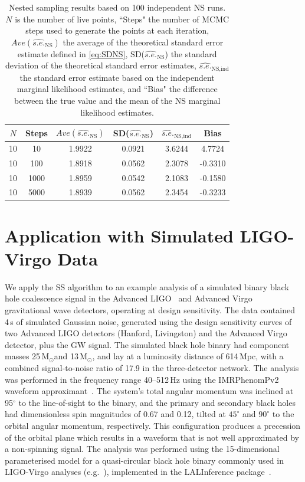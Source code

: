 \documentclass[aps,reprint,amsmath,amssymb,showpacs,showkeys]{revtex4-1}%
\newcommand{\Msun}{$\text{M}_{\odot}$}
\begin{document}
\begin{table}
	\caption{\label{tab:NSresults} Nested sampling results based on 100 independent NS runs.  $N$ is the number of live points, ``Steps" the number of MCMC steps used to generate the points at each iteration, $Ave(\widehat{s.e.}_{\text{NS}})$ the average of the theoretical standard error estimate defined in \eqref{eq:SDNS}, SD($\widehat{s.e.}_{\text{NS}}$) the standard deviation of the theoretical standard error estimates, $\widehat{s.e.}_{\text{NS,ind}}$ the standard error estimate based on the independent marginal likelihood estimates, and ``Bias" the difference between the true value and the mean of the NS marginal likelihood estimates.}
	\begin{ruledtabular}
		\begin{tabular}{cccccc}
			$N$ & Steps & $Ave(\widehat{s.e.}_{\text{NS}})$ & SD($\widehat{s.e.}_{\text{NS}}$) & $\widehat{s.e.}_{\text{NS,ind}}$  & Bias \\ \hline
			10&10&1.9922&0.0921&3.6244&4.7724\\
			10&100&1.8918&0.0562&2.3078&-0.3310\\
			10&1000&1.8959&0.0542&2.1083&-0.1580\\
			10&5000&1.8939&0.0562&2.3454&-0.3233\\
		\end{tabular}
	\end{ruledtabular}
\end{table}

\section{Application with Simulated LIGO-Virgo Data} \label{sec:LIGO}
We apply the SS algorithm to an example analysis of a simulated binary black hole
coalescence signal in the Advanced LIGO~\cite{0264-9381-32-7-074001} and Advanced
Virgo~\cite{0264-9381-32-2-024001}
gravitational wave detectors, operating at design sensitivity.
The data contained 4\,s of simulated Gaussian noise, generated using the design
sensitivity curves of two Advanced LIGO detectors (Hanford, Livingston) and the Advanced Virgo detector,
plus the GW signal. The simulated black hole binary had component masses
25\,\Msun and 13\,\Msun, and lay at a luminosity distance of 614\,Mpc, with a
combined signal-to-noise ratio of 17.9 in the three-detector network.
The analysis was performed in the frequency range 40--512\,Hz using the IMRPhenomPv2
waveform approximant~\cite{Hannam:2013oca}. The system's total angular momentum
was inclined at 95$^\circ$ to the line-of-sight to the binary, and the primary
and secondary black holes had dimensionless spin magnitudes of 0.67 and 0.12,
tilted at $45^\circ$ and $90^\circ$ to the orbital angular momentum, respectively. This
configuration produces a precession of the orbital plane which results in a
waveform that is not well approximated by a non-spinning signal. The analysis
was performed using the 15-dimensional parameterised model for a quasi-circular
black hole binary commonly used in LIGO-Virgo analyses (e.g.~\cite{PhysRevLett.116.241102,
O1BBH}), implemented in the LALInference package~\cite{Veitch:2015}.
\end{document}
